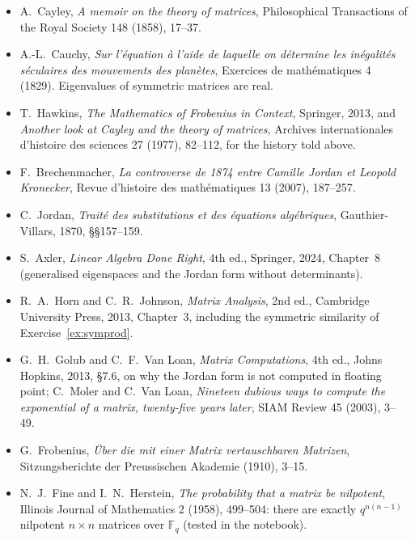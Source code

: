 \begin{itemize}
\item A.~Cayley, \emph{A memoir on the theory of matrices}, Philosophical Transactions of the Royal Society 148 (1858),
17--37.
\item A.-L.~Cauchy, \emph{Sur l'\'equation \`a l'aide de laquelle on d\'etermine les in\'egalit\'es s\'eculaires des
mouvements des plan\`etes}, Exercices de math\'ematiques 4 (1829). Eigenvalues of symmetric matrices are real.
\item T.~Hawkins, \emph{The Mathematics of Frobenius in Context}, Springer, 2013, and \emph{Another look at Cayley and the
theory of matrices}, Archives internationales d'histoire des sciences 27 (1977), 82--112, for the history told above.
\item F.~Brechenmacher, \emph{La controverse de 1874 entre Camille Jordan et Leopold Kronecker}, Revue d'histoire des
math\'ematiques 13 (2007), 187--257.
\item C.~Jordan, \emph{Trait\'e des substitutions et des \'equations alg\'ebriques}, Gauthier-Villars, 1870, \S\S157--159.
\item S.~Axler, \emph{Linear Algebra Done Right}, 4th ed., Springer, 2024, Chapter~8 (generalised eigenspaces and the
Jordan form without determinants).
\item R.~A.~Horn and C.~R.~Johnson, \emph{Matrix Analysis}, 2nd ed., Cambridge University Press, 2013, Chapter~3, including
the symmetric similarity of Exercise~\ref{ex:symprod}.
\item G.~H.~Golub and C.~F.~Van Loan, \emph{Matrix Computations}, 4th ed., Johns Hopkins, 2013, \S7.6, on why the Jordan
form is not computed in floating point; C.~Moler and C.~Van Loan, \emph{Nineteen dubious ways to compute the exponential of a
matrix, twenty-five years later}, SIAM Review 45 (2003), 3--49.
\item G.~Frobenius, \emph{\"Uber die mit einer Matrix vertauschbaren Matrizen}, Sitzungsberichte der Preussischen Akademie
(1910), 3--15.
\item N.~J.~Fine and I.~N.~Herstein, \emph{The probability that a matrix be nilpotent}, Illinois Journal of Mathematics 2
(1958), 499--504: there are exactly $q^{n(n-1)}$ nilpotent $n\times n$ matrices over $\mathbb F_q$ (tested in the notebook).
\end{itemize}
